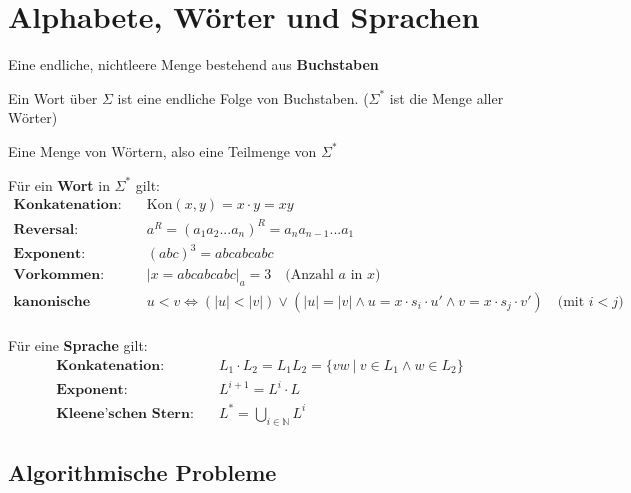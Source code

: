 \documentclass[11pt]{article}
\begin{document}
\section{Alphabete, Wörter und Sprachen}

\begin{description}[labelindent=16pt,style=multiline,leftmargin=5cm, noitemsep]
	\item[Alphabet $\Sigma$:] Eine endliche, nichtleere Menge bestehend aus \textbf{Buchstaben}
	\item[Wort:] Ein Wort über $\Sigma$ ist eine endliche Folge von Buchstaben. ($\Sigma^*$ ist die Menge aller Wörter)
	\item[Sprache $L$:] Eine Menge von Wörtern, also eine Teilmenge von $\Sigma^*$
\end{description}

Für ein \textbf{Wort} in $\Sigma^*$ gilt:
\begin{equation*}
\begin{split}
	\textbf{Konkatenation:}\quad & \text{Kon}(x,y) = x \cdot y = xy \\
	\textbf{Reversal:} \quad & a^R = (a_1a_2...a_n)^R = a_na_{n-1}...a_1 \\
	\textbf{Exponent:} \quad & (abc)^3 = abcabcabc \\
	\textbf{Vorkommen:} \quad & |x = abcabcabc|_a = 3\quad\text{(Anzahl $a$ in $x$)} \\
	\textbf{kanonische Ordnung:} \quad & u < v \Leftrightarrow (|u| < |v|) \lor (|u| = |v| \land u = x \cdot s_i \cdot u' \land v = x \cdot s_j \cdot v') \quad\text{(mit $i < j$)} \\
\end{split}
\end{equation*}

Für eine \textbf{Sprache} gilt:
\begin{equation*}
\begin{split}
	\textbf{Konkatenation:}\quad & L_1\cdot L_2 = L_1L_2 = \{vw\ |\ v \in L_1 \land w \in L_2\} \\
	\textbf{Exponent:}\quad & L^{i+1} = L^i\cdot L \\
	\textbf{Kleene'schen Stern:}\quad & L^* = \bigcup_{i\in\mathbb{N}}L^i
\end{split}
\end{equation*}

\subsection{Algorithmische Probleme}
\end{document}
